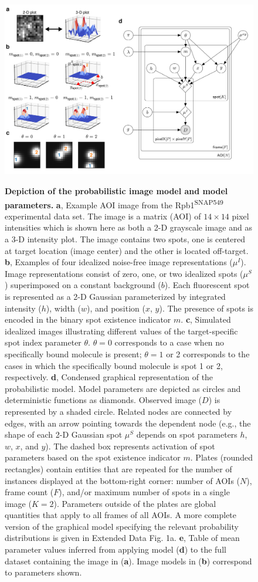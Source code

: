 \begin{figure}[ht]
\centering
\includegraphics[width=183mm]{figures/figure2/figure2.png}
\label{fig:tapqir_model}
\caption{\textbf{Depiction of the probabilistic image model and model parameters.} \textbf{a}, Example AOI image from the Rpb1\textsuperscript{SNAP549} experimental data set. The image is a matrix (AOI) of $14 \times 14$ pixel intensities which is shown here as both a 2-D grayscale image and as a 3-D intensity plot. The image contains two spots, one is centered at target location (image center) and the other is located off-target. \textbf{b}, Examples of four idealized noise-free image representations ($\mu^I$). Image representations consist of zero, one, or two idealized spots ($\mu^S$) superimposed on a constant background ($b$). Each fluorescent spot is represented as a 2-D Gaussian parameterized by integrated intensity ($h$), width ($w$), and position ($x$, $y$). The presence of spots is encoded in the binary spot existence indicator $m$. \textbf{c}, Simulated idealized images illustrating different values of the target-specific spot index parameter $\theta$. $\theta = 0$ corresponds to a case when no specifically bound molecule is present; $\theta = 1$ or 2 corresponds to the cases in which the specifically bound molecule is spot 1 or 2, respectively. \textbf{d}, Condensed graphical representation of the probabilistic model. Model parameters are depicted as circles and deterministic functions as diamonds. Observed image ($D$) is represented by a shaded circle. Related nodes are connected by edges, with an arrow pointing towards the dependent node (e.g., the shape of each 2-D Gaussian spot $\mu^S$ depends on spot parameters $h$, $w$, $x$, and $y$). The dashed box represents activation of spot parameters based on the spot existence indicator $m$. Plates (rounded rectangles) contain entities that are repeated for the number of instances displayed at the bottom-right corner: number of AOIs ($N$), frame count ($F$), and/or maximum number of spots in a single image ($K=2$). Parameters outside of the plates are global quantities that apply to all frames of all AOIs. A more complete version of the graphical model specifying the relevant probability distributions is given in Extended Data Fig. 1a. \textbf{e}, Table of mean parameter values inferred from applying model (\textbf{d}) to the full dataset containing the image in (\textbf{a}). Image models in (\textbf{b}) correspond to parameters shown. }

\end{figure}
